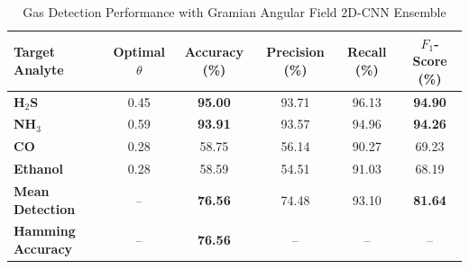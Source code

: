 \begin{table}[htbp]
\centering
\caption{Gas Detection Performance with Gramian Angular Field 2D-CNN Ensemble}
\label{tab:gaf_ensemble}
\begin{tabular}{lccccc}
\toprule
Target Analyte & Optimal $\theta$ & Accuracy (\%) & Precision (\%) & Recall (\%) & $F_1$-Score (\%) \\
\midrule
\textbf{H$_2$S} & 0.45 & \textbf{95.00} & 93.71 & 96.13 & \textbf{94.90} \\
\textbf{NH$_3$} & 0.59 & \textbf{93.91} & 93.57 & 94.96 & \textbf{94.26} \\
\textbf{CO} & 0.28 & 58.75 & 56.14 & 90.27 & 69.23 \\
\textbf{Ethanol} & 0.28 & 58.59 & 54.51 & 91.03 & 68.19 \\
\midrule
\textbf{Mean Detection} & -- & \textbf{76.56} & 74.48 & 93.10 & \textbf{81.64} \\
\textbf{Hamming Accuracy} & -- & \textbf{76.56} & -- & -- & -- \\
\bottomrule
\end{tabular}
\end{table}
